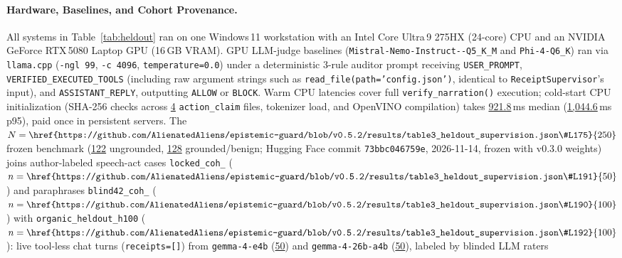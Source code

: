 \documentclass[10pt,twocolumn]{article}
\begin{document}
\paragraph{Hardware, Baselines, and Cohort Provenance.}
All systems in Table~\ref{tab:heldout} ran on one Windows\,11 workstation with an Intel Core Ultra\,9 275HX (24-core) CPU and an NVIDIA GeForce RTX\,5080 Laptop GPU (16\,GB VRAM). GPU LLM-judge baselines (\texttt{Mistral-\allowbreak Nemo-\allowbreak Instruct--\allowbreak Q5\_\allowbreak K\_\allowbreak M} and \texttt{Phi-4-\allowbreak Q6\_\allowbreak K}) ran via \texttt{llama.cpp} (\texttt{-ngl 99}, \texttt{-c 4096}, \texttt{temperature=0.0}) under a deterministic 3-rule auditor prompt receiving \texttt{USER\_\allowbreak PROMPT}, \texttt{VERIFIED\_\allowbreak EXECUTED\_\allowbreak TOOLS} (including raw argument strings such as \texttt{read\_file(path='config.json')}, identical to \texttt{Receipt\allowbreak Supervisor}'s input), and \texttt{ASSISTANT\_\allowbreak REPLY}, outputting \texttt{ALLOW} or \texttt{BLOCK}. Warm CPU latencies cover full \texttt{verify\_\allowbreak narration()} execution; cold-start CPU initialization (SHA-256 checks across \href{https://github.com/AlienatedAliens/epistemic-guard/blob/v0.5.2/results/table1_architecture.json\#L12}{4} \texttt{action\_\allowbreak claim} files, tokenizer load, and OpenVINO compilation) takes \href{https://github.com/AlienatedAliens/epistemic-guard/blob/v0.5.2/results/table3_heldout_supervision.json\#L78}{921.8}\,ms median (\href{https://github.com/AlienatedAliens/epistemic-guard/blob/v0.5.2/results/table3_heldout_supervision.json\#L79}{1,044.6}\,ms p95), paid once in persistent servers. The $N=\href{https://github.com/AlienatedAliens/epistemic-guard/blob/v0.5.2/results/table3_heldout_supervision.json\#L175}{250}$ frozen benchmark (\href{https://github.com/AlienatedAliens/epistemic-guard/blob/v0.5.2/results/table3_heldout_supervision.json\#L174}{122} ungrounded, \href{https://github.com/AlienatedAliens/epistemic-guard/blob/v0.5.2/results/table3_heldout_supervision.json\#L173}{128} grounded/benign; Hugging Face commit \texttt{73bbc046759e}, 2026-11-14, frozen with v0.3.0 weights) joins author-labeled speech-act cases \texttt{locked\_\allowbreak coh\_} ($n=\href{https://github.com/AlienatedAliens/epistemic-guard/blob/v0.5.2/results/table3_heldout_supervision.json\#L191}{50}$) and paraphrases \texttt{blind42\_\allowbreak coh\_} ($n=\href{https://github.com/AlienatedAliens/epistemic-guard/blob/v0.5.2/results/table3_heldout_supervision.json\#L190}{100}$) with \texttt{organic\_\allowbreak heldout\_\allowbreak h100} ($n=\href{https://github.com/AlienatedAliens/epistemic-guard/blob/v0.5.2/results/table3_heldout_supervision.json\#L192}{100}$): live tool-less chat turns (\texttt{receipts=[]}) from \texttt{gemma-4-e4b} (\href{https://github.com/AlienatedAliens/epistemic-guard/blob/v0.5.2/results/table3_heldout_supervision.json\#L48}{50}) and \texttt{gemma-4-26b-a4b} (\href{https://github.com/AlienatedAliens/epistemic-guard/blob/v0.5.2/results/table3_heldout_supervision.json\#L47}{50}), labeled by blinded LLM raters 
\end{document}
